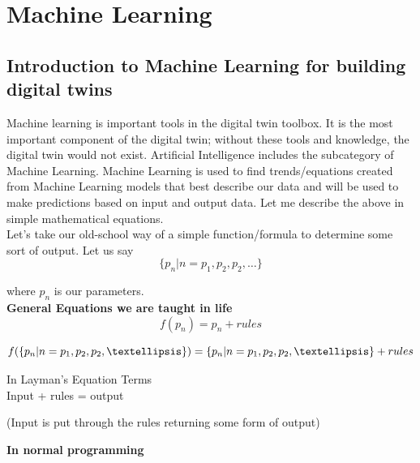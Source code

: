 \section{Machine Learning}
\subsection{Introduction to Machine Learning for building digital twins}

Machine learning is important tools in the digital twin toolbox. It is the most important component of the digital twin; without these tools and knowledge, the digital twin would not exist. Artificial Intelligence includes the subcategory of Machine Learning. Machine Learning is used to find trends/equations created from Machine Learning models that best describe our data and will be used to make predictions based on input and output data.
Let me describe the above in simple mathematical equations. \\

Let’s take our old-school way of a simple function/formula to determine some sort of output. Let us say
\begin{equation}
    \{p_n | n=p_1,p_2,p_2,\dots\}
\end{equation}

where $p_n$ is our parameters.\\

\textbf{General Equations we are taught in life} \\


\begin{equation}
    f(p_n)= p_n+rules
\end{equation}

\begin{equation}
    f(\{p_n | n=p_1,p_2,p_2,…\}) = \{p_n | n=p_1,p_2,p_2,…\}+rules \\
\end{equation}


\begin{center}
In Layman’s Equation Terms \\ 
Input + rules = output \\ 
\end{center}

\begin{center}
    (Input is put through the rules returning some form of output)
\end{center}


\textbf{In normal programming} \\

